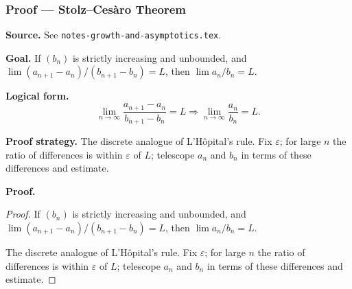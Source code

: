 

\clearpage
{}
\hypertarget{proof-RA-ABB-T-stolz-cesaro}{}

\subsubsection[Stolz--Ces{\`a}ro Theorem]{Proof --- Stolz--Ces{\`a}ro Theorem}

\bigskip

\noindent
\textbf{Source.} See \texttt{notes-growth-and-asymptotics.tex}.

\vspace{0.75em}

\noindent
\textbf{Goal.} If $(b_n)$ is strictly increasing and unbounded, and $\lim (a_{n+1} - a_n)/(b_{n+1} - b_n) = L$, then $\lim a_n/b_n = L$.

\vspace{0.75em}

\noindent
\textbf{Logical form.}
\[
  \lim_{n\to\infty} \frac{a_{n+1}-a_n}{b_{n+1}-b_n} = L \Rightarrow \lim_{n\to\infty} \frac{a_n}{b_n} = L.
\]

\vspace{0.75em}

\noindent
\textbf{Proof strategy.} The discrete analogue of L'Hôpital's rule. Fix $\varepsilon$; for large $n$ the ratio of differences is within $\varepsilon$ of $L$; telescope $a_n$ and $b_n$ in terms of these differences and estimate.

\vspace{0.75em}

\noindent
\textbf{Proof.}
\begin{proof}
\Claim If $(b_n)$ is strictly increasing and unbounded, and $\lim (a_{n+1} - a_n)/(b_{n+1} - b_n) = L$, then $\lim a_n/b_n = L$.

\Given 

\Goal 

\Strategy The discrete analogue of L'Hôpital's rule. Fix $\varepsilon$; for large $n$ the ratio of differences is within $\varepsilon$ of $L$; telescope $a_n$ and $b_n$ in terms of these differences and estimate.

\medskip


\end{proof}

